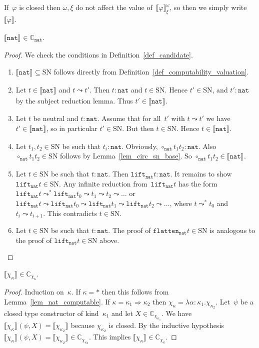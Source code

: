 \documentclass[a4paper,UKenglish,cleveref,autoref,numberwithinsect]{lipics-v2019}
\theoremstyle{definition}
\newcommand{\arrkind}{\Rightarrow}
\newcommand{\arrW}{\leadsto}
\newcommand{\nat}{\mathtt{nat}}
\newcommand{\flatten}{\mathtt{flatten}}
\newcommand{\lift}{\mathtt{lift}}
\newcommand{\SN}{\mathrm{SN}}
\newcommand{\Cb}{\mathbb{C}}
\newcommand{\val}[3]{\ensuremath{\llbracket#1\rrbracket_{#2}^{#3}}}
\begin{document}
If~$\varphi$ is closed then $\omega,\xi$ do not affect the value
of~$\val{\varphi}{\xi}{\omega}$, so then we simply
write~$\val{\varphi}{}{}$.

\begin{lemma}\label{lem_nat_computable}
  $\val{\nat}{}{} \in \Cb_{\nat}$.
\end{lemma}

\begin{proof}
  We check the conditions in Definition~\ref{def_candidate}.
  \begin{enumerate}
  \item $\val{\nat}{}{} \subseteq \SN$ follows
    directly from Definition~\ref{def_computability_valuation}.
  \item Let $t \in \val{\nat}{}{}$ and $t \arrW t'$. Then $t :
    \nat$ and $t \in \SN$. Hence $t' \in \SN$, and $t' : \nat$ by the
    subject reduction lemma. Thus $t' \in \val{\nat}{}{}$.
  \item Let $t$ be neutral and $t : \nat$. Assume that for all~$t'$
    with $t \arrW t'$ we have $t' \in \val{\nat}{}{}$, so in
    particular $t' \in \SN$. But then $t \in \SN$. Hence $t \in
    \val{\nat}{}{}$.
  \item Let $t_1,t_2 \in \SN$ be such that $t_i : \nat$. Obviously,
    $\circ_\nat t_1 t_2 : \nat$. Also $\circ_\nat t_1 t_2 \in \SN$
    follows by Lemma~\ref{lem_circ_sn_base}. So $\circ_\nat t_1 t_2
    \in \val{\nat}{}{}$.
  \item Let $t \in \SN$ be such that $t : \nat$. Then $\lift_\nat t :
    \nat$. It remains to show $\lift_\nat t \in \SN$. Any infinite
    reduction from~$\lift_\nat t$ has the form $\lift_\nat t
    \arrW^* \lift_\nat t_0 \arrW t_1 \arrW t_2 \arrW
    \ldots$ or $\lift_\nat t \arrW \lift_\nat t_0 \arrW
    \lift_\nat t_1 \arrW \lift_\nat t_2 \arrW \ldots$, where $t
    \arrW^* t_0$ and $t_i \arrW t_{i+1}$. This contradicts $t
    \in \SN$.
  \item Let $t \in \SN$ be such that $t : \nat$. The proof of
    $\flatten_\nat t \in \SN$ is analogous to the proof of $\lift_\nat
    t \in \SN$ above.\qedhere
  \end{enumerate}
\end{proof}

\begin{lemma}\label{lem_chi_kappa_computable}
  $\val{\chi_\kappa}{}{} \in \Cb_{\chi_\kappa}$.
\end{lemma}

\begin{proof}
  Induction on~$\kappa$. If $\kappa = *$ then this follows from
  Lemma~\ref{lem_nat_computable}. If $\kappa=\kappa_1\arrkind\kappa_2$
  then $\chi_\kappa = \lambda \alpha : \kappa_1
  . \chi_{\kappa_2}$. Let~$\psi$ be a closed type constructor of
  kind~$\kappa_1$ and let $X \in \Cb_{\chi_{\kappa_1}}$. We have
  $\val{\chi_\kappa}{}{}(\psi,X) = \val{\chi_{\kappa_2}}{}{}$ because
  $\chi_{\kappa_2}$ is closed. By the inductive hypothesis
  $\val{\chi_\kappa}{}{}(\psi,X) = \val{\chi_{\kappa_2}}{}{} \in
  \Cb_{\chi_{\kappa_2}}$. This implies $\val{\chi_\kappa}{}{} \in
  \Cb_{\chi_\kappa}$.
\end{proof}
\end{document}
